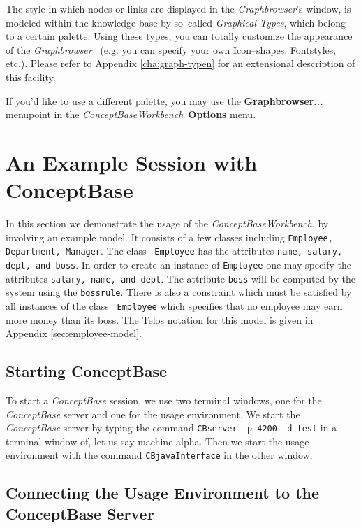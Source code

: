 The style in which nodes or links are displayed in the {\em Graphbrowser}'s window, is 
modeled within the knowledge base by so--called {\em Graphical Types}, which belong to a certain palette. 
Using these types, you can totally customize the appearance of the 
{\em Graphbrowser} \ (e.g. you can specify your own Icon--shapes, Fontstyles, etc.). 
Please refer to Appendix \ref{cha:graph-typen} for an extensional 
description of this facility.

If you'd like to use a different palette, you may use the {\bf Graphbrowser...} menupoint in the {\em ConceptBase\/Workbench}\ {\bf Options} menu.


\section{An Example Session with ConceptBase}			\label{sec:session}


In this section we demonstrate the usage of the {\em ConceptBase\/Workbench}, by involving an example model. It consists of a few classes 
including {\tt Employee, Department, Manager}. The class {\tt 
Employee} has the attributes {\tt name, salary, dept, and boss}. In 
order to create an instance of {\tt Employee} one may specify the 
attributes {\tt salary, name,  and dept}. The attribute {\tt boss} 
will be computed by the system using the {\tt bossrule}. There is also a 
constraint which must be satisfied by all instances of the class {\tt 
Employee} which specifies that no employee may earn more money than its 
boss. The Telos notation for this model is given in Appendix 
\ref{sec:employee-model}.


\subsection{Starting ConceptBase}


To start a {\em ConceptBase} session, we use two terminal windows, one for the {\em ConceptBase} 
server and one for the usage environment. We start the {\em ConceptBase} server 
by typing the command {\tt CBserver -p 4200 -d test}  in a terminal 
window of, let us say machine alpha. Then we start the usage environment with 
the command {\tt CBjavaInterface} in the other window. 



\subsection{Connecting the Usage Environment to the ConceptBase Server}


